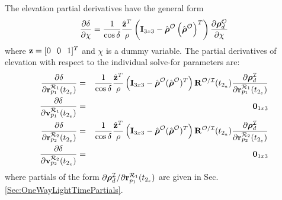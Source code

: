 %
The elevation partial derivatives have the general form
%
\begin{equation}
    \frac{\partial \delta}{\partial \chi} = \frac{1}{\cos{\delta}}\frac{\hat{\mathbf{z}}^T}{\rho}
    \left(\mathbf{I}_{3x3} - \hat{ \boldsymbol{\rho} }^{\mcO}
    \left(\hat{ \boldsymbol{\rho}}^{\mcO}  \right) ^T  \right)\frac{\partial  \boldsymbol{\rho}_d^{\mcO}  }{\partial \chi}
\end{equation}
%
where $\mathbf{z} = [0 \hspace{.1 in} 0 \hspace{0.1 in} 1]^T$ and
$\chi$ is a dummy variable.  The partial derivatives of elevation
with respect to the individual solve-for parameters are:
%
\begin{eqnarray}
    \frac{\partial \delta}{\partial \mathbf{r}^{\mcR_1}_{p_1}(t_{2_e})} & = &
     \frac{1}{\cos{\delta}}\frac{\hat{\mathbf{z}}^T}{\rho}
    \left(\mathbf{I}_{3x3} - \hat{\boldsymbol{\rho}}^{\mcO}
    (\hat{\boldsymbol{\rho}}^{\mcO} )^T  \right)\mathbf{R}^{{\mcO}/{\mcI}}(t_{2_{a}})\frac{\partial  \boldsymbol{\rho}_d^{\mcI}  }{\partial \mathbf{r}^{\mcR_1}_{p_1}(t_{2_e})}\\
    \frac{\partial \delta}{\partial \mathbf{v}^{\mcR_1}_{p_1}(t_{2_e})} & = & \mathbf{0}_{1x3} \\
    \frac{\partial \delta}{\partial \mathbf{r}^{\mcR_2}_{p_2}(t_{2_e})} & = &
     \frac{1}{\cos{\delta}}\frac{\hat{\mathbf{z}}^T}{\rho}
    \left(\mathbf{I}_{3x3} - \hat{\boldsymbol{\rho}}^{\mcO}
    (\hat{\boldsymbol{\rho}}^{\mcO} )^T  \right)\mathbf{R}^{{\mcO}/{\mcI}}(t_{2_{a}})\frac{\partial  \boldsymbol{\rho}_d^{\mcI}  }{\partial \mathbf{r}^{\mcR_2}_{p_2}(t_{2_e})}\\
    \frac{\partial \delta}{\partial \mathbf{v}^{\mcR_2}_{p_2}(t_{2_e})} & = & \mathbf{0}_{1x3} \\
\end{eqnarray}
%
where partials of the form $\partial  \boldsymbol{\rho}_d^{\mcI}  /\partial \mathbf{r}^{\mcR_1}_{p_1}(t_{2_e})$ are given in Sec. \ref{Sec:OneWayLightTimePartials}.

